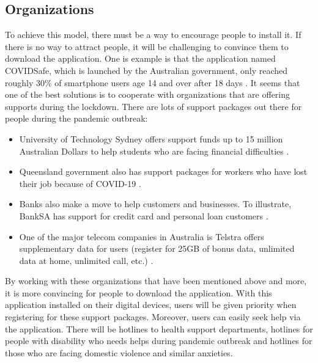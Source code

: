     \subsection{Organizations}
    \par To achieve this model, there must be a way to encourage people to install it. If there is no way to attract people, it will be challenging to convince them to download the application. One is example is that the application named COVIDSafe, which is launched by the Australian government, only reached roughly 30\% of smartphone users age 14 and over after 18 days \parencite{Stake2-6}. It seems that one of the best solutions is to cooperate with organizations that are offering supports during the lockdown. There are lots of support packages out there for people during the pandemic outbreak:
      \begin{itemize}
        \item University of Technology Sydney offers support funds up to 15 million Australian Dollars to help students who are facing financial difficulties \parencite{Stake2-7}.
        \item Queensland government also has support packages for workers who have lost their job because of COVID-19 \parencite{Stake2-8}.
        \item Banks also make a move to help customers and businesses. To illustrate, BankSA has support for credit card and personal loan customers \parencite{Stake2-9}.
        \item One of the major telecom companies in Australia is Telstra offers supplementary data for users (register for 25GB of bonus data, unlimited data at home, unlimited call, etc.) \parencite{Stake2-10}.
      \end{itemize}
    \par By working with these organizations that have been mentioned above and more, it is more convincing for people to download the application. With this application installed on their digital devices, users will be given priority when registering for these support packages. Moreover, users can easily seek help via the application. There will be hotlines to health support departments, hotlines for people with disability who needs helps during pandemic outbreak and hotlines for those who are facing domestic violence and similar anxieties.



